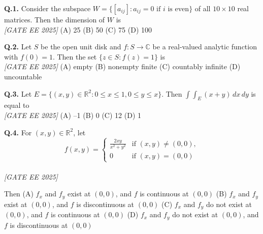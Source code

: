 \documentclass[11pt]{article}
\begin{document}
\textbf{Q.1.} Consider the subspace $W = \{[a_{ij}] : a_{ij} = 0 \text{ if } i \text{ is even} \}$ of all $10 \times 10$ real matrices. Then the dimension of $W$ is  
\\[1ex] \hfill \textit{[GATE EE 2025]}
\newline
(A) 25 \hspace{1cm} (B) 50 \hspace{1cm} (C) 75 \hspace{1cm} (D) 100

\vspace{0.5cm}

\textbf{Q.2.} Let $S$ be the open unit disk and $f : S \to \mathbb{C}$ be a real-valued analytic function with $f(0) = 1$. Then the set $\{z \in S : f(z) = 1\}$ is  
\\[1ex] \hfill \textit{[GATE EE 2025]}
\newline
(A) empty \hspace{1cm} (B) nonempty finite \hspace{1cm} (C) countably infinite \hspace{1cm} (D) uncountable

\vspace{0.5cm}

\textbf{Q.3.} Let $E = \{(x, y) \in \mathbb{R}^2 : 0 \le x \le 1, 0 \le y \le x \}$. Then $\int\int_E (x+y) \, dx \, dy$ is equal to 
\\[1ex] \hfill \textit{[GATE EE 2025]}
\newline
(A) –1 \hspace{1cm} (B) 0 \hspace{1cm} (C) 12 \hspace{1cm} (D) 1

\vspace{0.5cm}

\textbf{Q.4.} For $(x, y) \in \mathbb{R}^2$, let  
\[
f(x, y) = 
\begin{cases}
\frac{2xy}{x^2 + y^2} & \text{if } (x, y) \ne (0, 0), \\
0 & \text{if } (x, y) = (0, 0)
\end{cases}
\]  \\[1ex] \hfill \textit{[GATE EE 2025]}

Then  \newline
(A) $f_x$ and $f_y$ exist at $(0,0)$, and $f$ is continuous at $(0,0)$  \newline
(B) $f_x$ and $f_y$ exist at $(0,0)$, and $f$ is discontinuous at $(0,0)$  \newline
(C) $f_x$ and $f_y$ do not exist at $(0,0)$, and $f$ is continuous at $(0,0)$  \newline
(D) $f_x$ and $f_y$ do not exist at $(0,0)$, and $f$ is discontinuous at $(0,0)$\newline
\end{document}
